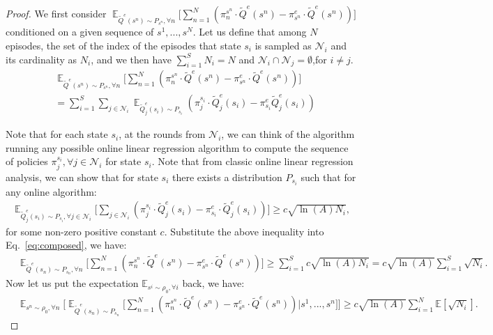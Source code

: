\documentclass{article}
\begin{document}
\begin{proof}
We first consider $\mathop{\mathbb{E}}_{\tilde{Q}^e(s^n)\sim P_{s^n},\forall n}\big[\sum_{n=1}^N(  \pi_n^{s^n}\cdot \tilde{Q}^e(s^n) - \pi^e_{s^n}\cdot \tilde{Q}^e(s^n))\big]$ conditioned on a given sequence of $s^1,...,s^N$.
Let us define that among $N$ episodes, the set of the index of the episodes that state $s_i$ is sampled as $\mathcal{N}_i$ and its cardinality as $N_i$, and we then have $\sum_{i=1}^S N_i = N$ and $\mathcal{N}_i \cap\mathcal{N}_j = \emptyset$,for $i\neq j$. 
\begin{align}
&\mathop{\mathbb{E}}_{\tilde{Q}^e(s^n)\sim P_{s^n},\forall n}\big[\sum_{n=1}^N(  \pi_n^{s^n}\cdot \tilde{Q}^e(s^n) - \pi^e_{s^n}\cdot \tilde{Q}^e(s^n))\big] \nonumber\\
& = \sum_{i=1}^S \sum_{j\in \mathcal{N}_i} \mathop{\mathbb{E}}_{\tilde{Q}_j^e(s_i)\sim P_{s_i}}(\pi_{j}^{s_i}\cdot\tilde{Q}_j^e(s_i) - \pi_{s_i}^e\tilde{Q}_j^e(s_i))
\label{eq:composed}
\end{align}


Note that for each state $s_i$, at the rounds from $\mathcal{N}_i$, we can think of the algorithm running any possible online linear regression algorithm to compute the sequence of policies $\pi_j^{s_i},\forall j\in \mathcal{N}_i$ for state $s_i$. Note that from classic online linear regression analysis, we can show that for state $s_i$ there exists a distribution $P_{s_i}$ such that for any online algorithm:
\begin{align}
\mathop{\mathbb{E}}_{\tilde{Q}^e_j(s_i)\sim P_{s_i},\forall j\in\mathcal{N}_i}\big[ \sum_{j\in\mathcal{N}_i} (\pi_{j}^{s_i} \cdot \tilde{Q}_j^e(s_i) - \pi_{s_i}^e\cdot \tilde{Q}_j^e(s_i))  \big] \geq c\sqrt{\ln(A) N_i},
\end{align} for some non-zero positive constant $c$.
Substitute the above inequality into Eq.~\ref{eq:composed}, we have:
\begin{align}
&\mathop{\mathbb{E}}_{\tilde{Q}^e(s_n)\sim P_{s_n},\forall n}\big[\sum_{n=1}^N(   \pi_n^{s^n}\cdot \tilde{Q}^e(s^n) -\pi^e_{s^n}\cdot \tilde{Q}^e(s^n))\big]\geq \sum_{i=1}^S c\sqrt{\ln(A)N_i} = c\sqrt{\ln(A)}\sum_{i=1}^S\sqrt{N_i}.
\end{align}
Now let us put the expectation $\mathbb{E}_{s^i\sim\rho_0,\forall i}$ back, we have:
\begin{align}
\label{eq:fact_1}
&\mathop{\mathbb{E}}_{s^n\sim\rho_0,\forall n}\Big[\mathop{\mathbb{E}}_{\tilde{Q}^e(s_n)\sim P_{s_n}}\big[\sum_{n=1}^N( \pi_n^{s^n}\cdot \tilde{Q}^e(s^n) - \pi^e_{s^n}\cdot \tilde{Q}^e(s^n))|s^1,...,s^n\big]\Big]\geq  c\sqrt{\ln(A)}\sum_{i=1}^N\mathbb{E}[\sqrt{N_i}].
\end{align}


\end{proof}
\end{document}
